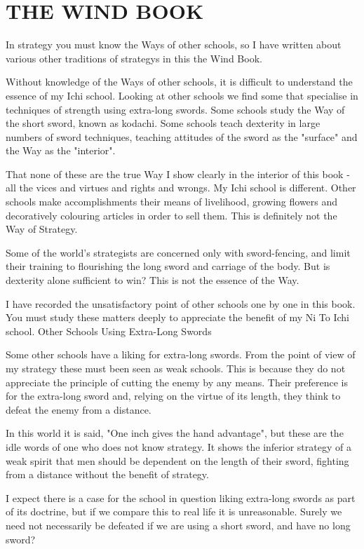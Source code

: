 \chapter{THE WIND BOOK}

In strategy you must know the Ways of other schools, so I have written about various other traditions of strategys in this the Wind Book.

Without knowledge of the Ways of other schools, it is difficult to understand the essence of my Ichi school. Looking at other schools we find some that specialise in techniques of strength using extra-long swords. Some schools study the Way of the short sword, known as kodachi. Some schools teach dexterity in large numbers of sword techniques, teaching attitudes of the sword as the "surface" and the Way as the "interior".

That none of these are the true Way I show clearly in the interior of this book - all the vices and virtues and rights and wrongs. My Ichi school is different. Other schools make accomplishments their means of livelihood, growing flowers and decoratively colouring articles in order to sell them. This is definitely not the Way of Strategy.

Some of the world's strategists are concerned only with sword-fencing, and limit their training to flourishing the long sword and carriage of the body. But is dexterity alone sufficient to win? This is not the essence of the Way.

I have recorded the unsatisfactory point of other schools one by one in this book. You must study these matters deeply to appreciate the benefit of my Ni To Ichi school.
Other Schools Using Extra-Long Swords

Some other schools have a liking for extra-long swords. From the point of view of my strategy these must been seen as weak schools. This is because they do not appreciate the principle of cutting the enemy by any means. Their preference is for the extra-long sword and, relying on the virtue of its length, they think to defeat the enemy from a distance.

In this world it is said, "One inch gives the hand advantage", but these are the idle words of one who does not know strategy. It shows the inferior strategy of a weak spirit that men should be dependent on the length of their sword, fighting from a distance without the benefit of strategy.

I expect there is a case for the school in question liking extra-long swords as part of its doctrine, but if we compare this to real life it is unreasonable. Surely we need not necessarily be defeated if we are using a short sword, and have no long sword?

